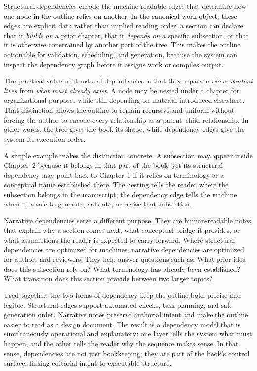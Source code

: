 Structural dependencies encode the machine-readable edges that determine how one node in the outline relies on another. In the canonical work object, these edges are explicit data rather than implied reading order: a section can declare that it \emph{builds on} a prior chapter, that it \emph{depends on} a specific subsection, or that it is otherwise constrained by another part of the tree. This makes the outline actionable for validation, scheduling, and generation, because the system can inspect the dependency graph before it assigns work or compiles output.

The practical value of structural dependencies is that they separate \emph{where content lives} from \emph{what must already exist}. A node may be nested under a chapter for organizational purposes while still depending on material introduced elsewhere. That distinction allows the outline to remain recursive and uniform without forcing the author to encode every relationship as a parent--child relationship. In other words, the tree gives the book its shape, while dependency edges give the system its execution order.

A simple example makes the distinction concrete. A subsection may appear inside Chapter~2 because it belongs in that part of the book, yet its structural dependency may point back to Chapter~1 if it relies on terminology or a conceptual frame established there. The nesting tells the reader where the subsection belongs in the manuscript; the dependency edge tells the machine when it is safe to generate, validate, or revise that subsection.

Narrative dependencies serve a different purpose. They are human-readable notes that explain why a section comes next, what conceptual bridge it provides, or what assumptions the reader is expected to carry forward. Where structural dependencies are optimized for machines, narrative dependencies are optimized for authors and reviewers. They help answer questions such as: What prior idea does this subsection rely on? What terminology has already been established? What transition does this section provide between two larger topics?

Used together, the two forms of dependency keep the outline both precise and legible. Structural edges support automated checks, task planning, and safe generation order. Narrative notes preserve authorial intent and make the outline easier to read as a design document. The result is a dependency model that is simultaneously operational and explanatory: one layer tells the system what must happen, and the other tells the reader why the sequence makes sense. In that sense, dependencies are not just bookkeeping; they are part of the book's control surface, linking editorial intent to executable structure.


